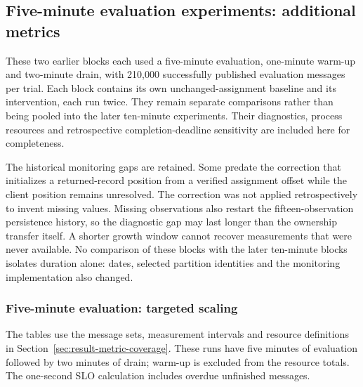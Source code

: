 \subsection{Five-minute evaluation experiments: additional metrics}
These two earlier blocks each used a five-minute evaluation, one-minute warm-up and two-minute drain, with 210,000 successfully published evaluation messages per trial. Each block contains its own unchanged-assignment baseline and its intervention, each run twice. They remain separate comparisons rather than being pooled into the later ten-minute experiments. Their diagnostics, process resources and retrospective completion-deadline sensitivity are included here for completeness.

The historical monitoring gaps are retained. Some predate the correction that initializes a returned-record position from a verified assignment offset while the client position remains unresolved. The correction was not applied retrospectively to invent missing values. Missing observations also restart the fifteen-observation persistence history, so the diagnostic gap may last longer than the ownership transfer itself. A shorter growth window cannot recover measurements that were never available. No comparison of these blocks with the later ten-minute blocks isolates duration alone: dates, selected partition identities and the monitoring implementation also changed.
\subsubsection{Five-minute evaluation: targeted scaling}
The tables use the message sets, measurement intervals and resource definitions in Section~\ref{sec:result-metric-coverage}. These runs have five minutes of evaluation followed by two minutes of drain; warm-up is excluded from the resource totals. The one-second SLO calculation includes overdue unfinished messages.

